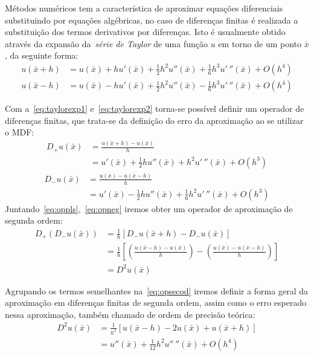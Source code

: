 \documentclass[
	12pt,				  %
	openright,		%
	twoside,			%
	a4paper,			%
	chapter=TITLE,		    %
	english,			%
	brazil				%
	]{abntex2}
\begin{document}
Métodos numéricos tem a característica de aproximar equações diferenciais
substituindo por equações algébricas, no caso de diferenças finitas é
realizada a substituição dos termos derivativos por diferenças. Isto é
usualmente obtido através da expansão da~\textit{série de Taylor} de uma
função $u$ em torno de um ponto $\bar{x}$, da seguinte forma:
\begin{align}   
    u(\bar{x} + h) &= u(\bar{x}) + hu'(\bar{x}) + \frac{1}{2}h^2u''(\bar{x}) +
    \frac{1}{6}h^3u'\,''(\bar{x}) + O(h^4)\label{eq:taylorexp1} \\
    u(\bar{x} - h) &= u(\bar{x}) - hu'(\bar{x}) + \frac{1}{2}h^2u''(\bar{x}) -
    \frac{1}{6}h^3u'\,''(\bar{x}) + O(h^4)
\label{eq:taylorexp2}
\end{align}

Com a~\autoref{eq:taylorexp1} e~\autoref{eq:taylorexp2} torna-se possível
definir um operador de diferenças finitas, que trata-se da definição do erro da
aproximação ao se utilizar o MDF:
\begin{align}
    D_{+}u(\bar{x}) &= \frac{u(\bar{x} + h) - u(\bar{x})}{h}\label{eq:oppls}\\
                    &= u'(\bar{x}) + \frac{1}{2}hu''(\bar{x}) +
                    h^2u'\,''(\bar{x}) + O(h^3) 
\end{align}
\begin{align}
    D_{-}u(\bar{x}) &= \frac{u(\bar{x}) - u(\bar{x} - h)}{h} \label{eq:opneg}\\
                    &= u'(\bar{x}) - \frac{1}{2}hu''(\bar{x}) +
                    \frac{1}{6}h^2u'\,''(\bar{x}) + O(h^3)
\end{align}
Juntando~\autoref{eq:oppls},~\autoref{eq:opneg} iremos obter um operador de
aproximação de segunda ordem:
\begin{align}
    D_{+}(D_{-}u(\bar{x})) &= \frac{1}{h}\left[ D_{-}u(\bar{x} + h) -
    D_{-}u(\bar{x})\right]\\
    &=\frac{1}{h}\left[ \left( \frac{u(\bar{x} - h) - u(\bar{x})}{h}\right) -
    \left( \frac{u(\bar{x}) - u(\bar{x} - h)}{h}\right)\right]\label{eq:opsecod}\\
    &= D^{2}u(\bar{x}) 
\end{align}

Agrupando os termos semelhantes na~\autoref{eq:opsecod} iremos definir a forma
geral da aproximação em diferenças finitas de segunda ordem, assim como o erro
esperado nessa aproximação, também chamado de ordem de precisão teórica:
\begin{align}
    D^{2}u(\bar{x}) &= \frac{1}{h^{2}}\left[ u(\bar{x} - h) - 2u(\bar{x}) +
    u(\bar{x} + h) \right] \label{eq:difsecop}\\
    &= u '' (\bar{x}) + \frac{1}{12}h^2u ''\, ''(\bar{x}) + O(h^4)
\end{align}
\end{document}
